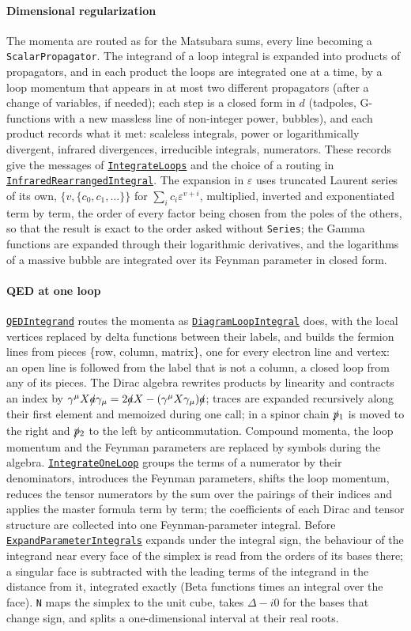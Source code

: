 \documentclass[11pt,a4paper]{article}
\newcommand{\pkg}[1]{\texttt{#1}}
\newcommand{\fnref}[1]{\hyperref[fn:#1]{\pkg{#1}}}
\begin{document}
\paragraph{Dimensional regularization} The momenta are routed as for the Matsubara sums, every line becoming a
\pkg{ScalarPropagator}. The integrand of a loop integral is expanded into products of propagators, and in each product
the loops are integrated one at a time, by a loop momentum that appears in at most two different propagators (after a
change of variables, if needed); each step is a closed form in $d$ (tadpoles, G-functions with a new massless line of
non-integer power, bubbles), and each product records what it met: scaleless integrals, power or logarithmically
divergent, infrared divergences, irreducible integrals, numerators. These records give the messages of
\fnref{IntegrateLoops} and the choice of a routing in \fnref{InfraredRearrangedIntegral}. The expansion in $\varepsilon$ uses
truncated Laurent series of its own, $\{v,\{c_0,c_1,\dots\}\}$ for $\sum_ic_i\varepsilon^{v+i}$, multiplied, inverted and
exponentiated term by term, the order of every factor being chosen from the poles of the others, so that the result is
exact to the order asked without \pkg{Series}; the Gamma functions are expanded through their logarithmic derivatives,
and the logarithms of a massive bubble are integrated over its Feynman parameter in closed form.

\paragraph{QED at one loop} \fnref{QEDIntegrand} routes the momenta as \fnref{DiagramLoopIntegral} does, with the local
vertices replaced by delta functions between their labels, and builds the fermion lines from pieces \{row, column,
matrix\}, one for every electron line and vertex: an open line is followed from the label that is not a column, a
closed loop from any of its pieces. The Dirac algebra rewrites products by linearity and contracts an index by
$\gamma^\mu X\slashed a\gamma_\mu=2\slashed aX-(\gamma^\mu X\gamma_\mu)\slashed a$; traces are expanded recursively along their
first element and memoized during one call; in a spinor chain $\slashed p{}_1$ is moved to the right and $\slashed p{}_2$ to
the left by anticommutation. Compound momenta, the loop momentum and the Feynman parameters are replaced by symbols
during the algebra. \fnref{IntegrateOneLoop} groups the terms of a numerator by their denominators, introduces the Feynman
parameters, shifts the loop momentum, reduces the tensor numerators by the sum over the pairings of their indices and
applies the master formula term by term; the coefficients of each Dirac and tensor structure are collected into one
Feynman-parameter integral. Before \fnref{ExpandParameterIntegrals} expands under the integral sign, the behaviour of the
integrand near every face of the simplex is read from the orders of its bases there; a singular face is subtracted with
the leading terms of the integrand in the distance from it, integrated exactly (Beta functions times an integral over
the face). \pkg{N} maps the simplex to the unit cube, takes $\Delta-i0$ for the bases that change sign, and splits a
one-dimensional interval at their real roots.
\end{document}
